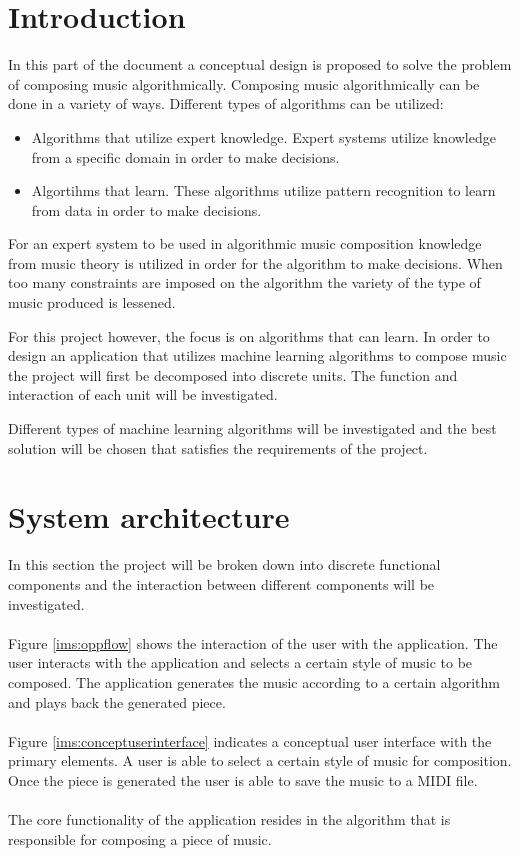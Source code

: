 

\chapter{Introduction}
In this part of the document a conceptual design is proposed to solve the problem of composing music algorithmically.
Composing music algorithmically can be done in a variety of ways. Different types of algorithms can be utilized:
\begin{itemize}
\item Algorithms that utilize expert knowledge. Expert systems utilize knowledge from a specific domain in order to make decisions.
\item Algortihms that learn. These algorithms utilize pattern recognition to learn from data in order to make decisions.
\end{itemize}
For an expert system to be used in algorithmic music composition knowledge from music theory is utilized in order for the algorithm to make decisions. When too many constraints are imposed on the algorithm the variety of the type of music produced is lessened.

For this project however, the focus is on algorithms that can learn. In order to design an application that utilizes machine learning algorithms to compose music the project will first be decomposed into discrete units. The function and interaction of each unit will be investigated. 

Different types of machine learning algorithms will be investigated and the best solution will be chosen that satisfies the requirements of the project.

\chapter{System architecture}
In this section the project will be broken down into discrete functional components and the interaction between different components will be investigated.
\\\\
Figure \ref{ims:oppflow} shows the interaction of the user with the application. 
The user interacts with the application and selects a certain style of music to be composed. The application generates the music according to a certain algorithm and plays back the generated piece. 
\\\\
Figure \ref{ims:conceptuserinterface} indicates a conceptual user interface with the primary elements. A user is able to select a certain style of music for composition. Once the piece is generated the user is able to save the music to a \ac{MIDI} file.
\\\\
The core functionality of the application resides in the algorithm that is responsible for composing a piece of music.

